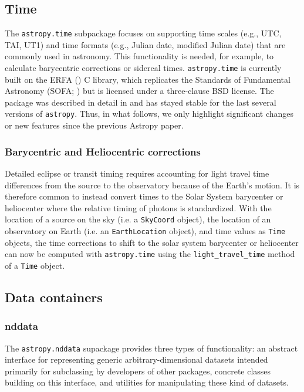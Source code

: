 \documentclass[modern]{aastex61}
\newcommand{\package}[1]{\texttt{#1}\xspace}
\newcommand{\astropy}{Astropy\xspace}
\newcommand{\astropypkg}{\package{astropy}}
\begin{document}
\subsection{Time}
\label{sec:time}

The \package{astropy.time} subpackage focuses on supporting time scales (e.g.,
UTC, TAI, UT1) and time formats (e.g., Julian date, modified Julian date) that
are commonly used in astronomy.
This functionality is needed, for example, to calculate barycentric corrections
or sidereal times.
\package{astropy.time} is currently built on the ERFA (\citealt{erfa}) C
library, which replicates the Standards of Fundamental Astronomy (SOFA;
\citealt{sofa}) but is licensed under a three-clause BSD license.
The package was described in detail in  \citet{astropy} and has
stayed stable for the last several versions of \astropypkg.
Thus, in what follows, we only highlight significant changes or new features
since the previous \astropy paper.


\subsubsection{Barycentric and Heliocentric corrections}
Detailed eclipse or transit
        timing requires accounting for light travel time differences from the
        source to the observatory because of the Earth's motion.
        It is therefore common to instead convert times to the Solar System
        barycenter or heliocenter where the relative timing of photons is
        standardized.
        With the location of a source on the sky (i.e. a \texttt{SkyCoord}
        object), the location of an observatory on Earth (i.e. an
        \texttt{EarthLocation} object), and time values as \texttt{Time}
        objects, the time corrections to shift to the solar system barycenter or
        heliocenter can now be computed with \package{astropy.time} using the
        \texttt{light\_travel\_time} method of a \texttt{Time} object.

\subsection{Data containers}

\subsubsection{nddata}

The \package{astropy.nddata} supackage provides three types of functionality: an
abstract interface for representing generic arbitrary-dimensional datasets
intended primarily for subclassing by developers of other packages, concrete
classes building on this interface, and utilities for manipulating these kind of
datasets.
\end{document}
